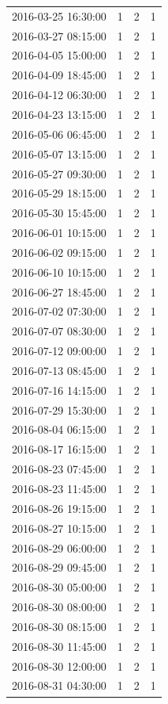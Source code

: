 \begin{tabular}{lrrr}
2016-03-25 16:30:00 & 1 & 2 & 1 \\
2016-03-27 08:15:00 & 1 & 2 & 1 \\
2016-04-05 15:00:00 & 1 & 2 & 1 \\
2016-04-09 18:45:00 & 1 & 2 & 1 \\
2016-04-12 06:30:00 & 1 & 2 & 1 \\
2016-04-23 13:15:00 & 1 & 2 & 1 \\
2016-05-06 06:45:00 & 1 & 2 & 1 \\
2016-05-07 13:15:00 & 1 & 2 & 1 \\
2016-05-27 09:30:00 & 1 & 2 & 1 \\
2016-05-29 18:15:00 & 1 & 2 & 1 \\
2016-05-30 15:45:00 & 1 & 2 & 1 \\
2016-06-01 10:15:00 & 1 & 2 & 1 \\
2016-06-02 09:15:00 & 1 & 2 & 1 \\
2016-06-10 10:15:00 & 1 & 2 & 1 \\
2016-06-27 18:45:00 & 1 & 2 & 1 \\
2016-07-02 07:30:00 & 1 & 2 & 1 \\
2016-07-07 08:30:00 & 1 & 2 & 1 \\
2016-07-12 09:00:00 & 1 & 2 & 1 \\
2016-07-13 08:45:00 & 1 & 2 & 1 \\
2016-07-16 14:15:00 & 1 & 2 & 1 \\
2016-07-29 15:30:00 & 1 & 2 & 1 \\
2016-08-04 06:15:00 & 1 & 2 & 1 \\
2016-08-17 16:15:00 & 1 & 2 & 1 \\
2016-08-23 07:45:00 & 1 & 2 & 1 \\
2016-08-23 11:45:00 & 1 & 2 & 1 \\
2016-08-26 19:15:00 & 1 & 2 & 1 \\
2016-08-27 10:15:00 & 1 & 2 & 1 \\
2016-08-29 06:00:00 & 1 & 2 & 1 \\
2016-08-29 09:45:00 & 1 & 2 & 1 \\
2016-08-30 05:00:00 & 1 & 2 & 1 \\
2016-08-30 08:00:00 & 1 & 2 & 1 \\
2016-08-30 08:15:00 & 1 & 2 & 1 \\
2016-08-30 11:45:00 & 1 & 2 & 1 \\
2016-08-30 12:00:00 & 1 & 2 & 1 \\
2016-08-31 04:30:00 & 1 & 2 & 1 \\

\end{tabular}
